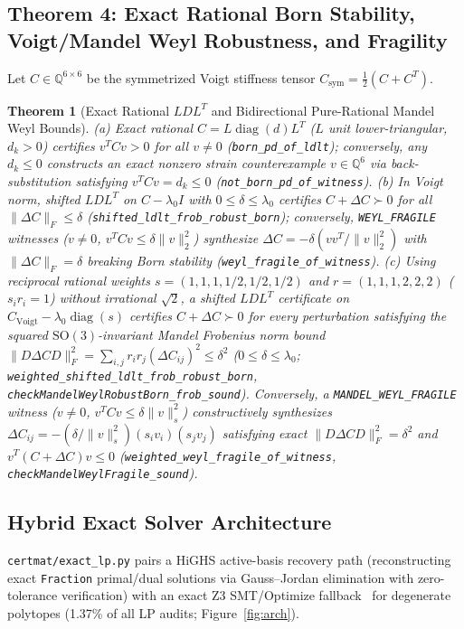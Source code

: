\documentclass[11pt,a4paper]{article}
\newcommand{\br}{\allowbreak{}}
\newtheorem{theorem}{Theorem}
\begin{document}
\subsection{Theorem 4: Exact Rational Born Stability, Voigt/Mandel Weyl Robustness, and Fragility}
Let $C \in \mathbb{Q}^{6\times 6}$ be the symmetrized Voigt stiffness tensor $C_{\mathrm{sym}} = \frac{1}{2}(C + C^T)$.

\begin{theorem}[Exact Rational $LDL^T$ and Bidirectional Pure-Rational Mandel Weyl Bounds]
(a) Exact rational $C = L\operatorname{diag}(d)L^T$ ($L$ unit lower-triangular, $d_k > 0$) certifies $v^T C v > 0$ for all $v \ne 0$ (\texttt{born\_\br{}pd\_\br{}of\_\br{}ldlt}); conversely, any $d_k \le 0$ constructs an exact nonzero strain counterexample $v \in \mathbb{Q}^6$ via back-substitution satisfying $v^T C v = d_k \le 0$ (\texttt{not\_\br{}born\_\br{}pd\_\br{}of\_\br{}witness}).
(b) In Voigt norm, shifted $LDL^T$ on $C - \lambda_0 I$ with $0 \le \delta \le \lambda_0$ certifies $C + \Delta C \succ 0$ for all $\|\Delta C\|_F \le \delta$ (\texttt{shifted\_\br{}ldlt\_\br{}frob\_\br{}robust\_\br{}born}); conversely, \texttt{WEYL\_\br{}FRAGILE} witnesses ($v \ne 0$, $v^T C v \le \delta \|v\|_2^2$) synthesize $\Delta C = -\delta (vv^T / \|v\|_2^2)$ with $\|\Delta C\|_F = \delta$ breaking Born stability (\texttt{weyl\_\br{}fragile\_\br{}of\_\br{}witness}).
(c) Using reciprocal rational weights $s = (1,1,1,1/2,1/2,1/2)$ and $r = (1,1,1,2,2,2)$ ($s_i r_i = 1$) without irrational $\sqrt{2}$, a shifted $LDL^T$ certificate on $C_{\mathrm{Voigt}} - \lambda_0 \operatorname{diag}(s)$ certifies $C + \Delta C \succ 0$ for every perturbation satisfying the squared $\mathrm{SO}(3)$-invariant Mandel Frobenius norm bound $\|D\Delta C D\|_F^2 = \sum_{i,j} r_i r_j (\Delta C_{ij})^2 \le \delta^2$ ($0 \le \delta \le \lambda_0$; \texttt{weighted\_\br{}shifted\_\br{}ldlt\_\br{}frob\_\br{}robust\_\br{}born}, \texttt{checkMandelWeylRobustBorn\_\br{}frob\_\br{}sound}). Conversely, a \texttt{MANDEL\_\br{}WEYL\_\br{}FRAGILE} witness ($v \ne 0$, $v^T C v \le \delta \|v\|_s^2$) constructively synthesizes $\Delta C_{ij} = -(\delta / \|v\|_s^2)(s_i v_i)(s_j v_j)$ satisfying exact $\|D\Delta C D\|_F^2 = \delta^2$ and $v^T(C + \Delta C)v \le 0$ (\texttt{weighted\_\br{}weyl\_\br{}fragile\_\br{}of\_\br{}witness}, \texttt{checkMandelWeylFragile\_\br{}sound}).
\end{theorem}

\subsection{Hybrid Exact Solver Architecture}
\texttt{certmat/exact\_lp.py} pairs a HiGHS active-basis recovery path (reconstructing exact \texttt{Fraction} primal/dual solutions via Gauss--Jordan elimination with zero-tolerance verification) with an exact Z3 SMT/Optimize fallback~\cite{demoura2008z3} for degenerate polytopes (1.37\% of all LP audits; Figure~\ref{fig:arch}).
\end{document}
